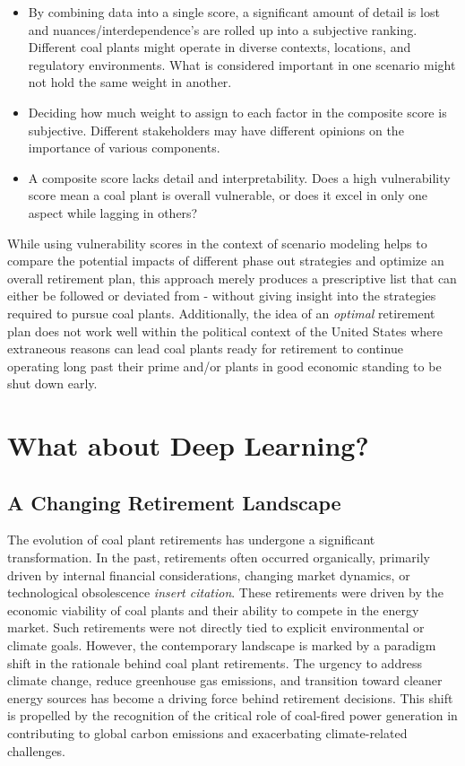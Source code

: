 \documentclass{article}
\begin{document}
\begin{itemize}
    \item By combining data into a single score, a significant amount of detail is lost and nuances/interdependence's are rolled up into a subjective ranking. Different coal plants might operate in diverse contexts, locations, and regulatory environments. What is considered important in one scenario might not hold the same weight in another.
    \item Deciding how much weight to assign to each factor in the composite score is subjective. Different stakeholders may have different opinions on the importance of various components.
    \item  A composite score lacks detail and interpretability. Does a high vulnerability score mean a coal plant is overall vulnerable, or does it excel in only one aspect while lagging in others?
\end{itemize}

While using vulnerability scores in the context of scenario modeling helps to compare the potential impacts of different phase out strategies and optimize an overall retirement plan, this approach merely produces a prescriptive list that can either be followed or deviated from - without giving insight into the strategies required to pursue coal plants. Additionally, the idea of an \textit{optimal} retirement plan does not work well within the political context of the United States where extraneous reasons can lead coal plants ready for retirement to continue operating long past their prime and/or plants in good economic standing to be shut down early. 

\section{What about Deep Learning?}

\subsection{A Changing Retirement Landscape}

The evolution of coal plant retirements has undergone a significant transformation. In the past, retirements often occurred organically, primarily driven by internal financial considerations, changing market dynamics, or technological obsolescence \textit{insert citation}. These retirements were driven by the economic viability of coal plants and their ability to compete in the energy market. Such retirements were not directly tied to explicit environmental or climate goals. However, the contemporary landscape is marked by a paradigm shift in the rationale behind coal plant retirements. The urgency to address climate change, reduce greenhouse gas emissions, and transition toward cleaner energy sources has become a driving force behind retirement decisions. This shift is propelled by the recognition of the critical role of coal-fired power generation in contributing to global carbon emissions and exacerbating climate-related challenges.
\end{document}
